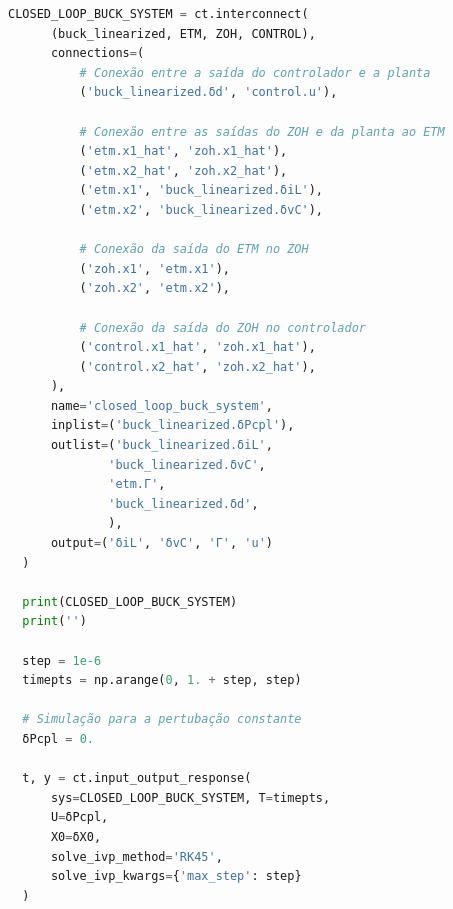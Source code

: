 \vspace{8pt}
\begin{lstlisting}[language=Python, caption={Sistema em loop fechado sob o ETC.}, label=cod:closed_loop]
  CLOSED_LOOP_BUCK_SYSTEM = ct.interconnect(
      (buck_linearized, ETM, ZOH, CONTROL),
      connections=(
          # Conexão entre a saída do controlador e a planta
          ('buck_linearized.δd', 'control.u'),

          # Conexão entre as saídas do ZOH e da planta ao ETM
          ('etm.x1_hat', 'zoh.x1_hat'),
          ('etm.x2_hat', 'zoh.x2_hat'),
          ('etm.x1', 'buck_linearized.δiL'),
          ('etm.x2', 'buck_linearized.δvC'),

          # Conexão da saída do ETM no ZOH
          ('zoh.x1', 'etm.x1'),
          ('zoh.x2', 'etm.x2'),

          # Conexão da saída do ZOH no controlador
          ('control.x1_hat', 'zoh.x1_hat'),
          ('control.x2_hat', 'zoh.x2_hat'),
      ),
      name='closed_loop_buck_system',
      inplist=('buck_linearized.δPcpl'),
      outlist=('buck_linearized.δiL',
              'buck_linearized.δvC',
              'etm.Γ',
              'buck_linearized.δd',
              ),
      output=('δiL', 'δvC', 'Γ', 'u')
  )

  print(CLOSED_LOOP_BUCK_SYSTEM)
  print('')

  step = 1e-6
  timepts = np.arange(0, 1. + step, step)

  # Simulação para a pertubação constante
  δPcpl = 0.

  t, y = ct.input_output_response(
      sys=CLOSED_LOOP_BUCK_SYSTEM, T=timepts,
      U=δPcpl,
      X0=δX0,
      solve_ivp_method='RK45',
      solve_ivp_kwargs={'max_step': step}
  )
\end{lstlisting}